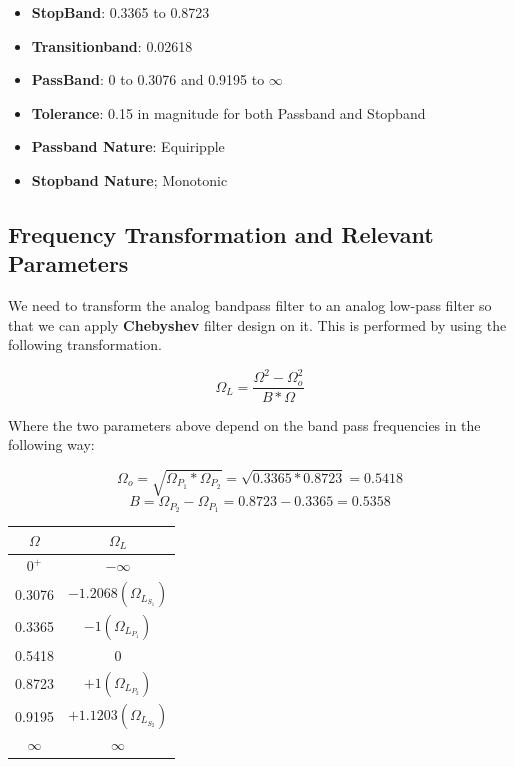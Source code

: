 \documentclass{scrartcl}
\begin{document}
\begin{itemize}

\item \textbf{StopBand}: 0.3365 to 0.8723

\item \textbf{Transitionband}: 0.02618

\item \textbf{PassBand}: 0 to 0.3076 and 0.9195 to $\infty$

\item \textbf{Tolerance}: 0.15 in magnitude for both Passband and Stopband

\item \textbf{Passband Nature}: Equiripple

\item \textbf{Stopband Nature}; Monotonic

\end{itemize}

\subsection{Frequency Transformation and Relevant Parameters}

We need to transform the analog bandpass filter to an analog low-pass filter so that we can apply \textbf{Chebyshev} filter design on it. This is performed by using the following transformation.

\begin{equation}
    \Omega_{L} = \frac{\Omega^2 - \Omega_{o}^2}{B*\Omega}
\end{equation}

Where the two parameters above depend on the band pass frequencies in the following way:

$$\Omega_{o} = \sqrt{\Omega_{P_1}*\Omega_{P_2}} = \sqrt{0.3365 * 0.8723} = 0.5418$$
$$ B = \Omega_{P_2} - \Omega_{P_1} = 0.8723 - 0.3365 = 0.5358$$

\begin{table}[!h]
    \centering

\begin{tabular}{|c|c|}
\hline
$\Omega$ & $\Omega_L$\\
\hline
$0^+$ & $-\infty$ \\
0.3076 &  $-1.2068 (\Omega_{L_{S_1}})$\\
0.3365 & $-1 (\Omega_{L_{P_1}})$ \\
0.5418 &  $0$\\
0.8723 & $+1 (\Omega_{L_{P_2}})$\\
0.9195 & $+1.1203(\Omega_{L_{S_2}})$\\
$\infty$ & $\infty$ \\
\hline
\end{tabular}

\end{table}
\end{document}
